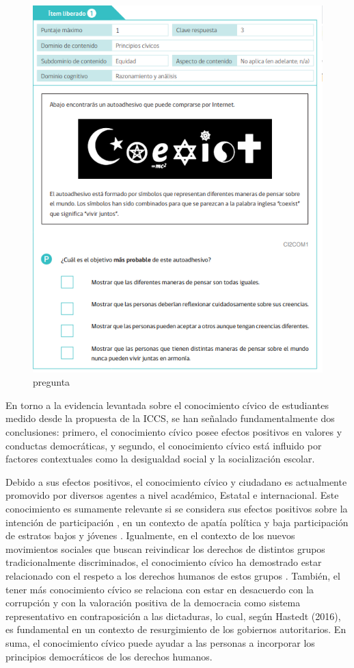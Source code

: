 \documentclass[12pt,twoside]{templates/facsothesis}
\begin{document}
\begin{figure}

{\centering \includegraphics[width=0.8\linewidth]{images/Pregunta-liberada1} 

}

\caption{pregunta}\label{fig:unnamed-chunk-2}
\end{figure}

En torno a la evidencia levantada sobre el conocimiento cívico de estudiantes medido desde la propuesta de la ICCS, se han señalado fundamentalmente dos conclusiones: primero, el conocimiento cívico posee efectos positivos en valores y conductas democráticas, y segundo, el conocimiento cívico está influido por factores contextuales como la desigualdad social y la socialización escolar.

Debido a sus efectos positivos, el conocimiento cívico y ciudadano es actualmente promovido por diversos agentes a nivel académico, Estatal e internacional. Este conocimiento es sumamente relevante si se considera sus efectos positivos sobre la intención de participación \citep{mirandaDesigualdadConocimientoCivico2015}, en un contexto de apatía política y baja participación de estratos bajos y jóvenes \citep{janmaatCivicCompetences2013, contrerasDIFERENCIASGENERACIONALESPARTICIPACION2013}. Igualmente, en el contexto de los nuevos movimientos sociales que buscan reivindicar los derechos de distintos grupos tradicionalmente discriminados, el conocimiento cívico ha demostrado estar relacionado con el respeto a los derechos humanos de estos grupos \citep{mirandaPoliticalSocializationAttitudes2018, caroTenHypothesesTolerance2012}. También, el tener más conocimiento cívico se relaciona con estar en desacuerdo con la corrupción y con la valoración positiva de la democracia como sistema representativo en contraposición a las dictaduras, lo cual, según Hastedt (2016), es fundamental en un contexto de resurgimiento de los gobiernos autoritarios. En suma, el conocimiento cívico puede ayudar a las personas a incorporar los principios democráticos de los derechos humanos.
\end{document}
